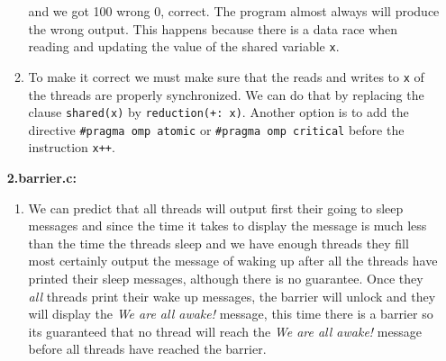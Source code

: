 \begin{enumerate}[label=\Alph*)]
\begin{enumerate}[label=\arabic*.]
        and we got 100 wrong 0, 
        correct. The program almost always will produce the wrong output. This happens because there is a data race when reading and updating the value
        of the shared variable \texttt{x}.
        \item To make it correct we must make sure that the reads and writes to \texttt{x} of the threads are properly synchronized. We can do that
        by replacing the clause \texttt{shared(x)} by \texttt{reduction(+: x)}. Another option is to add the directive \texttt{\#pragma omp atomic} or 
        \texttt{\#pragma omp critical} before the instruction \texttt{x++}.
    \end{enumerate}
    \textbf{2.barrier.c:}
    \begin{enumerate}[label=\arabic*.]
        \item We can predict that all threads will output first their going to sleep messages and since the time it takes to display the message is
        much less than the time the threads sleep and we have enough threads they fill most certainly output the message of waking up after all the threads
        have printed their sleep messages, although there is no guarantee. Once they \emph{all} threads print their wake up messages, the barrier will
        unlock and they will display the \emph{We are all awake!} message, this time there is a barrier so its guaranteed that no thread will
        reach the \emph{We are all awake!} message before all threads have reached the barrier.
        

\end{enumerate}
\end{enumerate}
